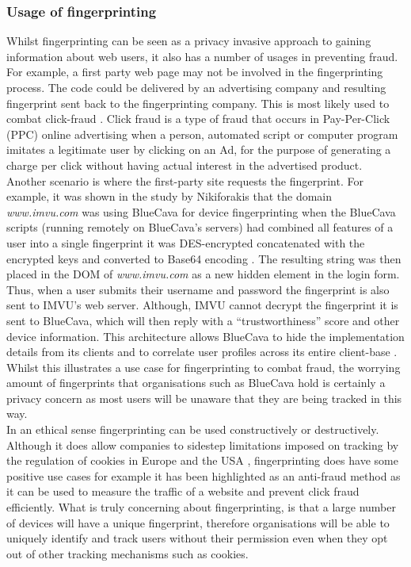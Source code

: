 \documentclass[12pt]{article}
\begin{document}
\subsubsection{Usage of fingerprinting}
Whilst fingerprinting can be seen as a privacy invasive approach to gaining information about web users, it also has a number of usages in preventing fraud. For example, a first party web page may not be involved in the fingerprinting process. The code could be delivered by an advertising company and resulting fingerprint sent back to the fingerprinting company. This is most likely used to combat click-fraud \parencite{cookielessMonster}. Click fraud is a type of fraud that occurs in Pay-Per-Click (PPC) online advertising when a person, automated script or computer program imitates a legitimate user by clicking on an Ad, for the purpose of generating a charge per click without having actual interest in the advertised product. Another scenario is where the first-party site requests the fingerprint. For example, it was shown in the study by Nikiforakis that the domain \textit{www.imvu.com} was using BlueCava for device fingerprinting when the BlueCava scripts (running remotely on BlueCava's servers) had combined all features of a user into a single fingerprint it was DES-encrypted concatenated with the encrypted keys and converted to Base64 encoding \parencite{cookielessMonster}. The resulting string was then placed in the DOM of \textit{www.imvu.com} as a new hidden element in the login form. Thus, when a user submits their username and password the fingerprint is also sent to IMVU's web server. Although, IMVU cannot decrypt the fingerprint it is sent to BlueCava, which will then reply with a “trustworthiness” score and other device information. This architecture allows BlueCava to hide the implementation details from its clients and to correlate user profiles across its entire client-base \parencite{cookielessMonster}. Whilst this illustrates a use case for fingerprinting to combat fraud, the worrying amount of fingerprints that organisations such as BlueCava hold is certainly a privacy concern as most users will be unaware that they are being tracked in this way.  \\ 

In an ethical sense fingerprinting can be used constructively or destructively. Although it does allow companies to sidestep limitations imposed on tracking by the regulation of cookies in Europe and the USA \parencite{dustingFP}, fingerprinting does have some positive use cases for example it has been highlighted as an anti-fraud method as it can be used to measure the traffic of a website and prevent click fraud efficiently. What is truly concerning about fingerprinting, is that a large number of devices will have a unique fingerprint, therefore organisations will be able to uniquely identify and track users without their permission even when they opt out of other tracking mechanisms such as cookies. 
\end{document}

